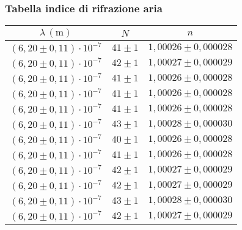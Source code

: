 \subsubsection{Tabella indice di rifrazione aria}
    \begin{table}[H]
    \centering
        \begin{tabular}{|c|c|c|}
        \hline
        $ \lambda \, (\text{m}) $ & $ N $ & $ n $ \\
        \hline
        $ (6,20 \pm 0,11) \cdot 10^{-7} $ & $ 41 \pm 1 $ & $ 1,00026 \pm 0,000028 $ \\
        \hline
        $ (6,20 \pm 0,11) \cdot 10^{-7} $ & $ 42 \pm 1 $ & $ 1,00027 \pm 0,000029 $ \\
        \hline
        $ (6,20 \pm 0,11) \cdot 10^{-7} $ & $ 41 \pm 1 $ & $ 1,00026 \pm 0,000028 $ \\
        \hline
        $ (6,20 \pm 0,11) \cdot 10^{-7} $ & $ 41 \pm 1 $ & $ 1,00026 \pm 0,000028 $ \\
        \hline
        $ (6,20 \pm 0,11) \cdot 10^{-7} $ & $ 41 \pm 1 $ & $ 1,00026 \pm 0,000028 $ \\
        \hline
        $ (6,20 \pm 0,11) \cdot 10^{-7} $ & $ 43 \pm 1 $ & $ 1,00028 \pm 0,000030 $ \\
        \hline
        $ (6,20 \pm 0,11) \cdot 10^{-7} $ & $ 40 \pm 1 $ & $ 1,00026 \pm 0,000028 $ \\
        \hline
        $ (6,20 \pm 0,11) \cdot 10^{-7} $ & $ 41 \pm 1 $ & $ 1,00026 \pm 0,000028 $ \\
        \hline
        $ (6,20 \pm 0,11) \cdot 10^{-7} $ & $ 42 \pm 1 $ & $ 1,00027 \pm 0,000029 $ \\
        \hline
        $ (6,20 \pm 0,11) \cdot 10^{-7} $ & $ 42 \pm 1 $ & $ 1,00027 \pm 0,000029 $ \\
        \hline
        $ (6,20 \pm 0,11) \cdot 10^{-7} $ & $ 43 \pm 1 $ & $ 1,00028 \pm 0,000030 $ \\
        \hline
        $ (6,20 \pm 0,11) \cdot 10^{-7} $ & $ 42 \pm 1 $ & $ 1,00027 \pm 0,000029 $ \\
        \hline
        \end{tabular}
    \end{table}